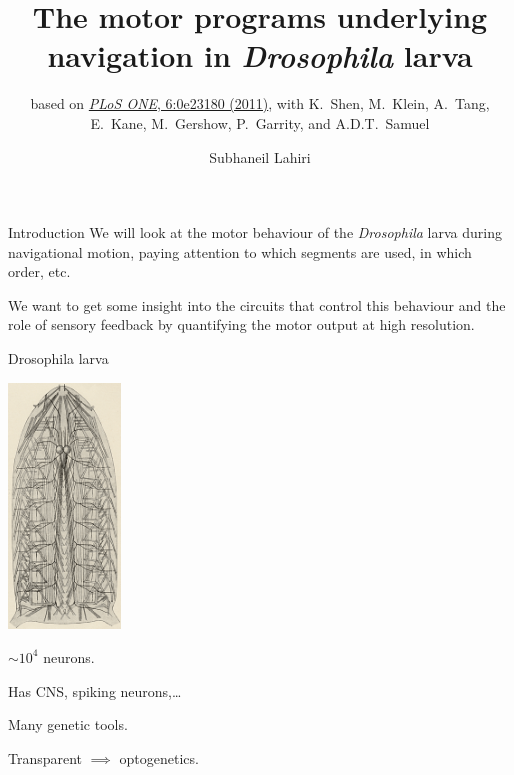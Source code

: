 \documentclass{beamer}%
\title[Motor programs in Drosophila larvae]{The motor programs underlying navigation in \emph{Drosophila} larva}
\subtitle{\small{based on \href{http://dx.doi.org/10.1371/journal.pone.0023180}{\emph{PLoS
  ONE}, 6:\penalty0e23180 (2011)},
  with  K.~Shen, M.~Klein, A.~Tang, E.~Kane, M.~Gershow, P.~Garrity, and A.D.T.~Samuel}\nocite{Lahiri2011}}
\author{Subhaneil Lahiri%
}
\institute[Harvard]{%
Harvard University
}
\begin{document}

\begin{frame}
%
 \titlepage
%
\end{frame}


\begin{frame}{Introduction}
%
 We will look at the motor behaviour of the \emph{Drosophila} larva during navigational motion, paying attention to which segments are used, in which order, etc.

 \vp We want to get some insight into the circuits that control this behaviour and the role of sensory feedback by quantifying the motor output at high resolution.

%
\end{frame}



\begin{frame}{Drosophila larva}
%
 \parbox{5cm}{
   \includegraphics[width=3cm]{Figs/HertweckNervousSys.png}\\
 }
 \parbox{6cm}{
   $\sim10^4$ neurons.

   \vp Has CNS, spiking neurons,\ldots{}

   \vp Many genetic tools.

   \vp Transparent $\implies$ optogenetics.
 }
%
\end{frame}

%
%
%
%
\end{document}
